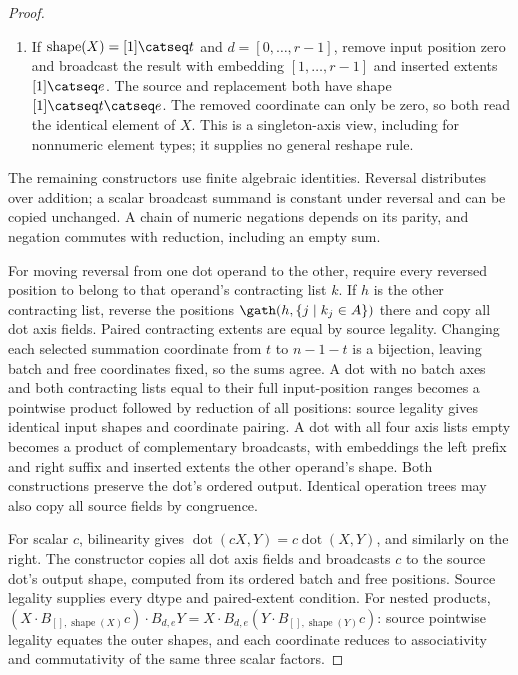 \begin{proof}
\begin{enumerate}
$\Sigma_A(B_{d,e}X)=B_{d',e}(\Sigma_QX)$, where
$Q=\{j\mid d_j\in A\}$ and the retained entries of $d'$ are
$d_j-|\{a\in A\mid a<d_j\}|$, in original input order.
Both sides sum exactly the same input coordinates; the formula removes
reduced positions from the ordered output. Reducing an inserted axis is
excluded, since it would introduce a multiplicity factor.
\item If $\operatorname{shape}(X)=[1]\catseq t$ and $d=[0,\ldots,r-1]$,
remove input position zero and broadcast the result with embedding
$[1,\ldots,r-1]$ and inserted extents $[1]\catseq e$. The source and
replacement both have shape $[1]\catseq t\catseq e$. The removed
coordinate can only be zero, so both read the identical element of $X$.
This is a singleton-axis view, including for nonnumeric element types;
it supplies no general reshape rule.
\end{enumerate}
The remaining constructors use finite algebraic identities. Reversal
distributes over addition; a scalar broadcast summand is constant under
reversal and can be copied unchanged. A chain of numeric negations depends
on its parity, and negation commutes with reduction, including an empty sum.

For moving reversal from one dot operand to the other, require every
reversed position to belong to that operand's contracting list $k$.
If $h$ is the other contracting list, reverse the positions
$\gath(h,\{j\mid k_j\in A\})$ there and copy all dot axis fields.
Paired contracting extents are equal by source legality. Changing each
selected summation coordinate from $t$ to $n-1-t$ is a bijection, leaving
batch and free coordinates fixed, so the sums agree.
A dot with no batch axes and both contracting lists equal to their full
input-position ranges becomes a pointwise product followed by reduction
of all positions: source legality gives identical input shapes and
coordinate pairing. A dot with all four axis lists empty becomes a product
of complementary broadcasts, with embeddings the left prefix and right
suffix and inserted extents the other operand's shape. Both constructions
preserve the dot's ordered output. Identical operation trees may also copy
all source fields by congruence.

For scalar $c$, bilinearity gives
$\operatorname{dot}(cX,Y)=c\operatorname{dot}(X,Y)$, and similarly on the
right. The constructor copies all dot axis fields and broadcasts $c$ to
the source dot's output shape, computed from its ordered batch and free
positions. Source legality supplies every dtype and paired-extent condition.
For nested products,
$(X\cdot B_{[],\operatorname{shape}(X)}c)\cdot B_{d,e}Y
=X\cdot B_{d,e}(Y\cdot B_{[],\operatorname{shape}(Y)}c)$:
source pointwise legality equates the outer shapes, and each coordinate
reduces to associativity and commutativity of the same three scalar factors.


\end{proof}
